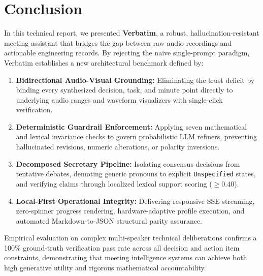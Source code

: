\documentclass[10pt,a4paper]{article}
\begin{document}
\section{Conclusion}
\label{sec:conclusion}

In this technical report, we presented \textbf{Verbatim}, a robust, hallucination-resistant meeting assistant that bridges the gap between raw audio recordings and actionable engineering records. By rejecting the naive single-prompt paradigm, Verbatim establishes a new architectural benchmark defined by:
\begin{enumerate}
    \item \textbf{Bidirectional Audio-Visual Grounding:} Eliminating the trust deficit by binding every synthesized decision, task, and minute point directly to underlying audio ranges and waveform visualizers with single-click verification.
    \item \textbf{Deterministic Guardrail Enforcement:} Applying seven mathematical and lexical invariance checks to govern probabilistic LLM refiners, preventing hallucinated revisions, numeric alterations, or polarity inversions.
    \item \textbf{Decomposed Secretary Pipeline:} Isolating consensus decisions from tentative debates, demoting generic pronouns to explicit \texttt{Unspecified} states, and verifying claims through localized lexical support scoring ($\ge 0.40$).
    \item \textbf{Local-First Operational Integrity:} Delivering responsive SSE streaming, zero-spinner progress rendering, hardware-adaptive profile execution, and automated Markdown-to-JSON structural parity assurance.
\end{enumerate}

Empirical evaluation on complex multi-speaker technical deliberations confirms a 100\% ground-truth verification pass rate across all decision and action item constraints, demonstrating that meeting intelligence systems can achieve both high generative utility and rigorous mathematical accountability.
\end{document}
